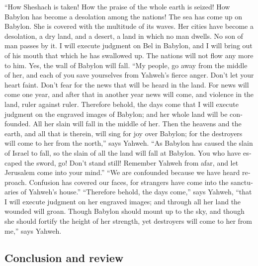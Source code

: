 \begin{paracol}{2}
\begin{otherlanguage}{english}
 ``How Sheshach is taken! How the praise of the whole
earth is seized! How Babylon has become a desolation among the nations!
 The sea has come up on Babylon. She is covered with the
multitude of its waves.  Her cities have become a
desolation, a dry land, and a desert, a land in which no man dwells. No
son of man passes by it.  I will execute judgment on Bel
in Babylon, and I will bring out of his mouth that which he has
swallowed up. The nations will not flow any more to him. Yes, the wall
of Babylon will fall.  ``My people, go away from the
middle of her, and each of you save yourselves from Yahweh's fierce
anger.  Don't let your heart faint. Don't fear for the
news that will be heard in the land. For news will come one year, and
after that in another year news will come, and violence in the land,
ruler against ruler.  Therefore behold, the days come
that I will execute judgment on the engraved images of Babylon; and her
whole land will be confounded. All her slain will fall in the middle of
her.  Then the heavens and the earth, and all that is
therein, will sing for joy over Babylon; for the destroyers will come to
her from the north,'' says Yahweh.  ``As Babylon has
caused the slain of Israel to fall, so the slain of all the land will
fall at Babylon.  You who have escaped the sword, go!
Don't stand still! Remember Yahweh from afar, and let Jerusalem come
into your mind.''  ``We are confounded because we have
heard reproach. Confusion has covered our faces, for strangers have come
into the sanctuaries of Yahweh's house.''  ``Therefore
behold, the days come,'' says Yahweh, ``that I will execute judgment on
her engraved images; and through all her land the wounded will groan.
 Though Babylon should mount up to the sky, and though
she should fortify the height of her strength, yet destroyers will come
to her from me,'' says Yahweh.

\hypertarget{conclusion-and-review}{%
\subsection{Conclusion and review}\label{conclusion-and-review}}


\end{otherlanguage}
\end{paracol}
